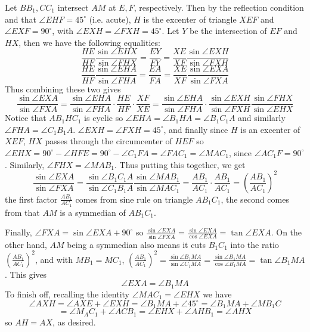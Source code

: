 \documentclass[11pt,a4paper]{article}
\begin{document}
\begin{enumerate}
    Let $BB_1, CC_1$ intersect $AM$ at $E, F$, respectively. 
    Then by the reflection condition and that $\angle EHF=45^{\circ}$ (i.e. acute), 
    $H$ is the excenter of triangle $XEF$ and $\angle EXF=90^{\circ}$, 
    with $\angle EXH=\angle FXH=45^{\circ}$. 
    Let $Y$ be the intersection of $EF$ and $HX$, then we have the following equalities: 
    \[
    \frac{HE}{HF}\frac{\sin\angle EHX}{\sin\angle FHX}
    =\frac{EY}{FY}
    =\frac{XE}{XF}\frac{\sin\angle EXH}{\sin\angle FXH}
    \]
    \[
    \frac{HE}{HF}\frac{\sin\angle EHA}{\sin\angle FHA}
    =\frac{EA}{FA}
    =\frac{XE}{XF}\frac{\sin\angle EXA}{\sin\angle FXA}
    \]
    Thus combining these two gives 
    \[
    \frac{\sin\angle EXA}{\sin\angle FXA}
    =\frac{\sin\angle EHA}{\sin\angle FHA}\cdot\frac{HE}{HF}\cdot\frac{XF}{XE}
    =\frac{\sin\angle EHA}{\sin\angle FHA}\cdot 
    \frac{\sin\angle EXH}{\sin\angle FXH}
    \frac{\sin\angle FHX}{\sin\angle EHX}
    \]
    Notice that $AB_1HC_1$ is cyclic so $\angle EHA = \angle B_1HA = \angle B_1C_1A$ and similarly 
    $\angle FHA = \angle C_1B_1A$. 
    $\angle EXH=\angle FXH=45^{\circ}$, and finally 
    since $H$ is an excenter of $XEF$, $HX$ passes through the circumcenter of $HEF$ so 
    $\angle EHX = 90^{\circ}-\angle HFE=90^{\circ}-\angle C_1FA = \angle FAC_1=\angle MAC_1$, 
    since $\angle AC_1F=90^{\circ}$. 
    Similarly, $\angle FHX = \angle MAB_1$. 
    Thus putting this together, we get 
    \[
    \frac{\sin\angle EXA}{\sin\angle FXA}
    =\frac{\sin\angle B_1C_1A}{\sin\angle C_1B_1A}
    \frac{\sin\angle MAB_1}{\sin\angle MAC_1}
    =\frac{AB_1}{AC_1}\cdot \frac{AB_1}{AC_1}
    =\left(\frac{AB_1}{AC_1}\right)^2
    \]
    the first factor $\frac{AB_1}{AC_1}$ comes from sine rule on triangle $AB_1C_1$, 
    the second comes from that $AM$ is a symmedian of $AB_1C_1$. 
    
    Finally, $\angle FXA=\sin\angle EXA+90^{\circ}$ so $\frac{\sin\angle EXA}{\sin\angle FXA}=
    \frac{\sin\angle EXA}{\cos\angle EXA}=\tan\angle EXA$. 
    On the other hand, $AM$ being a symmedian also means it cuts $B_1C_1$ into the ratio $\left(\frac{AB_1}{AC_1}\right)^2$, 
    and with $MB_1=MC_1$, 
    $\left(\frac{AB_1}{AC_1}\right)^2=\frac{\sin\angle B_1MA}{\sin\angle C_1MA}=
    \frac{\sin\angle B_1MA}{\cos\angle B_1MA}=\tan\angle B_1MA$. 
    This gives 
    \[
    \angle EXA=\angle B_1MA
    \]
    To finish off, recalling the identity $\angle MAC_1=\angle EHX$ we have 
    \[
    \angle AXH = \angle AXE+\angle EXH
    =\angle B_1MA+\angle 45^{\circ}
    =\angle B_1MA+\angle MB_1C
    \]\[
    =\angle M_AC_1+\angle ACB_1
    =\angle EHX+\angle AHB_1
    =\angle AHX
    \]
    so $AH=AX$, as desired. 
    

\end{enumerate}
\end{document}
